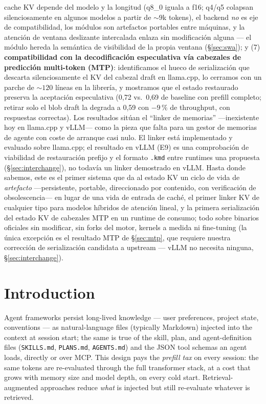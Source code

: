 \documentclass[11pt]{article}
\newcommand{\code}[1]{\texttt{#1}}
\begin{document}
cache KV depende del modelo y la longitud (q8\_0 iguala a f16; q4/q5 colapsan silenciosamente en algunos modelos a partir de ${\sim}9$k tokens), el backend \emph{no} es eje de compatibilidad, los módulos son artefactos portables entre máquinas, y la atención de ventana deslizante intercalada enlaza sin modificación alguna --- el módulo hereda la semántica de visibilidad de la propia ventana (\S\ref{sec:swa}); y (7) \textbf{compatibilidad con la decodificación especulativa vía cabezales de predicción multi-token (MTP)}: identificamos el hueco de serialización que descarta silenciosamente el KV del cabezal draft en llama.cpp, lo cerramos con un parche de ${\sim}120$ líneas en la librería, y mostramos que el estado restaurado preserva la aceptación especulativa (0,72 vs.\ 0,69 de baseline con prefill completo; retirar solo el blob draft la degrada a 0,59 con $-9\,\%$ de throughput, con respuestas correctas). Los resultados sitúan el ``linker de memorias'' ---inexistente hoy en llama.cpp y vLLM--- como la pieza que falta para un gestor de memorias de agente con coste de arranque casi nulo. El linker está implementado y evaluado sobre llama.cpp; el resultado en vLLM (E9) es una comprobación de viabilidad de restauración prefijo y el formato \code{.kmd} entre runtimes una propuesta (\S\ref{sec:interchange}), no todavía un linker demostrado en vLLM. Hasta donde sabemos, este es el primer sistema que da al estado KV un ciclo de vida de \emph{artefacto} ---persistente, portable, direccionado por contenido, con verificación de obsolescencia--- en lugar de una vida de entrada de caché, el primer linker KV de cualquier tipo para modelos híbridos de atención lineal, y la primera serialización del estado KV de cabezales MTP en un runtime de consumo; todo sobre binarios oficiales sin modificar, sin forks del motor, kernels a medida ni fine-tuning (la única excepción es el resultado MTP de \S\ref{sec:mtp}, que requiere nuestra corrección de serialización candidata a upstream --- vLLM no necesita ninguna, \S\ref{sec:interchange}).

\section{Introduction}

Agent frameworks persist long-lived knowledge --- user preferences, project state, conventions --- as natural-language files (typically Markdown) injected into the context at session start; the same is true of the skill, plan, and agent-definition files (\code{SKILLS.md}, \code{PLANS.md}, \code{AGENTS.md}) and the JSON tool schemas an agent loads, directly or over MCP. This design pays the \emph{prefill tax} on every session: the same tokens are re-evaluated through the full transformer stack, at a cost that grows with memory size and model depth, on every cold start. Retrieval-augmented approaches reduce \emph{what} is injected but still re-evaluate whatever is retrieved.
\end{document}

